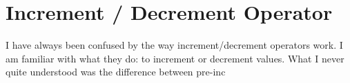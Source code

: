 \chapter{Increment / Decrement Operator}
I have always been confused by the way increment/decrement operators work. I am familiar with what they do: to increment or decrement values. What I never quite understood was the difference between pre-inc

\begin{lstlisting}

\end{lstlisting}